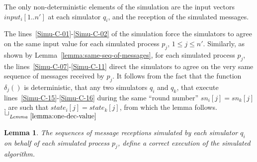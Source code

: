 \documentclass[11pt,letterpaper]{article}
\newtheorem{lemma}{Lemma}
\newlength {\afterproof}
\newcommand{\toto}{xxx}
\newenvironment{proofL}{\noindent{\bf Proof }}
{\hspace*{\fill}$\Box_{\mathit{Lemma}~\ref{\toto}}$\par\vspace{\afterproof}}
\begin{document}
\begin{proofL}
The only non-deterministic elements of the simulation are the input vectors
$input_i[1..n']$ at each simulator $q_i$, and the reception of the simulated
messages.

The lines~\ref{Simu-C-01}-\ref{Simu-C-02} of the
simulation force  the simulators to agree on the same input value
for each simulated process $p_j$, $1\leq j \leq n'$.
Similarly,  as shown by Lemma~\ref{lemma:same-seq-of-messages},
for each simulated process $p_j$, the lines~\ref{Simu-C-07}-\ref{Simu-C-11}
direct the simulators to  agree on the very same sequence of messages
received by $p_j$. It follows from the fact that the function $\delta_j()$
is deterministic, that   any two simulators $q_i$ and $q_k$,
that execute  lines~\ref{Simu-C-15}-\ref{Simu-C-16} during the
same ``round number'' $sn_i[j]=sn_k[j]$, are such that $state_i[j]=state_k[j]$,
from which the lemma follows.
\renewcommand{\toto}{lemma:one-dec-value}
\end{proofL}

\begin{lemma}
\label{lemma:correct-simulation}
The sequences of message receptions simulated by each simulator $q_i$
on behalf of each simulated process $p_j$, define a correct execution of
the simulated algorithm.
\end{lemma}
\end{document}
